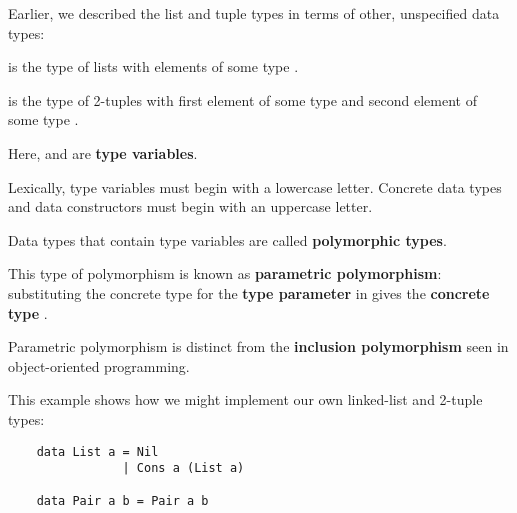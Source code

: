 \begin{notelist}
    \item Earlier, we described the list and tuple types in terms of other, unspecified data types:
    \begin{notelist}
        \item \code{[a]} is the type of lists with elements of some type .
        \item {} is the type of 2-tuples with first element of some type  and second 
              element of some type .
    \end{notelist}
    \item Here,  and  are \textbf{type variables}.
    \item Lexically, type variables must begin with a lowercase letter. Concrete data types and
          data constructors must begin with an uppercase letter.
    \item Data types that contain type variables are called \textbf{polymorphic types}. 
    \item This type of polymorphism is known as \textbf{parametric polymorphism}: substituting the concrete
          type  for the \textbf{type parameter}  in \code{[a]} gives the \textbf{concrete type}
          \code{[Char]}.
    \item Parametric polymorphism is distinct from the \textbf{inclusion polymorphism} seen in object-oriented
          programming.
    \item This example shows how we might implement our own linked-list and 2-tuple types:
    \begin{lstlisting}
    data List a = Nil
                | Cons a (List a) 

    data Pair a b = Pair a b


\end{lstlisting}
\end{notelist}
